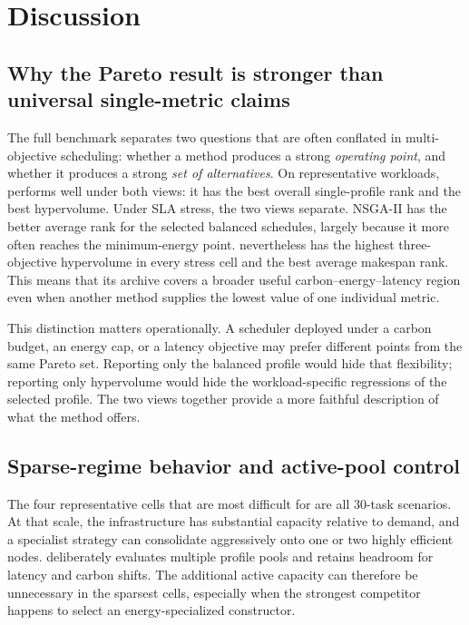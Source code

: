 \section{Discussion}
\label{sec:discussion}

\subsection{Why the Pareto result is stronger than universal single-metric claims}

The full benchmark separates two questions that are often conflated in multi-objective scheduling: whether a method produces a strong \emph{operating point}, and whether it produces a strong \emph{set of alternatives}. On representative workloads, \method performs well under both views: it has the best overall single-profile rank and the best hypervolume. Under SLA stress, the two views separate. NSGA-II has the better average rank for the selected balanced schedules, largely because it more often reaches the minimum-energy point. \method nevertheless has the highest three-objective hypervolume in every stress cell and the best average makespan rank. This means that its archive covers a broader useful carbon--energy--latency region even when another method supplies the lowest value of one individual metric.

This distinction matters operationally. A scheduler deployed under a carbon budget, an energy cap, or a latency objective may prefer different points from the same Pareto set. Reporting only the balanced profile would hide that flexibility; reporting only hypervolume would hide the workload-specific regressions of the selected profile. The two views together provide a more faithful description of what the method offers.

\subsection{Sparse-regime behavior and active-pool control}

The four representative cells that are most difficult for \method are all 30-task scenarios. At that scale, the infrastructure has substantial capacity relative to demand, and a specialist strategy can consolidate aggressively onto one or two highly efficient nodes. \method deliberately evaluates multiple profile pools and retains headroom for latency and carbon shifts. The additional active capacity can therefore be unnecessary in the sparsest cells, especially when the strongest competitor happens to select an energy-specialized constructor.

